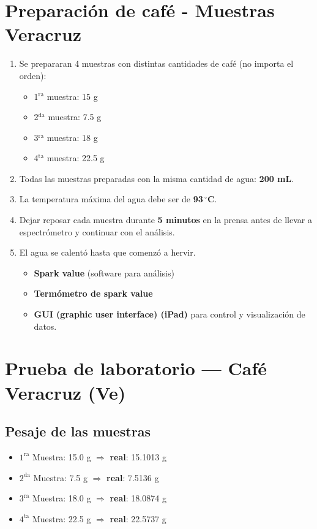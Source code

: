 \documentclass{article}
\begin{document}
\section*{Preparación de café - Muestras Veracruz}

\begin{enumerate}
	\item Se prepararan 4 muestras con distintas cantidades de café (no importa el orden):
	\begin{itemize}
		\item 1$^{\text{ra}}$ muestra: 15 g
		\item 2$^{\text{da}}$ muestra: 7.5 g
		\item 3$^{\text{ra}}$ muestra: 18 g
		\item 4$^{\text{ta}}$ muestra: 22.5 g
	\end{itemize}
	
	\item Todas las muestras preparadas con la misma cantidad de agua: \textbf{200 mL}.
	
	\item La temperatura máxima del agua debe ser de \textbf{93\,$^\circ$C}.
	
	\item Dejar reposar cada muestra durante \textbf{5 minutos} en la prensa antes de llevar a espectrómetro y continuar con el análisis.
	
	\item El agua se calentó hasta que comenzó a hervir.
	
	\begin{itemize}
		\item \textbf{Spark value} (software para análisis)
		\item \textbf{Termómetro de spark value}
		\item \textbf{GUI (graphic user interface) (iPad)} para control y visualización de datos.
	\end{itemize}
\end{enumerate} \vfill

\vspace{0.5cm}

\section{Prueba de laboratorio — Café Veracruz (Ve)} \vspace{0.5cm}

\subsection*{Pesaje de las muestras}
\begin{itemize}
	\item $1^\text{ra}$ Muestra: 15.0 g $\Rightarrow$ \textbf{real}: 15.1013 g
	\item $2^\text{da}$ Muestra: 7.5 g $\Rightarrow$ \textbf{real}: 7.5136 g
	\item $3^\text{ra}$ Muestra: 18.0 g $\Rightarrow$ \textbf{real}: 18.0874 g
	\item $4^\text{ta}$ Muestra: 22.5 g $\Rightarrow$ \textbf{real}: 22.5737 g
\end{itemize} \vspace{0.5cm}
\end{document}
